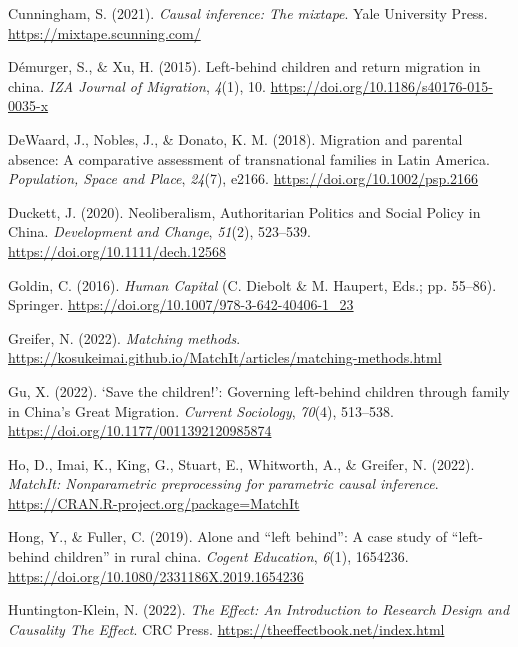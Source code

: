 \documentclass[
  man,floatsintext]{apa7}
\newlength{\cslhangindent}
\newlength{\cslentryspacingunit} %
\newenvironment{CSLReferences}[2] %
 {%
  \setlength{\parindent}{0pt}
  \ifodd #1
  \let\oldpar\par
  \def\par{\hangindent=\cslhangindent\oldpar}
  \fi
  \setlength{\parskip}{#2\cslentryspacingunit}
 }%
 {}
\begin{document}
\begin{CSLReferences}{1}{0}
\leavevmode{}%
Cunningham, S. (2021). \emph{Causal inference: The mixtape}. Yale University Press. \url{https://mixtape.scunning.com/}

\leavevmode{}%
Démurger, S., \& Xu, H. (2015). Left-behind children and return migration in china. \emph{IZA Journal of Migration}, \emph{4}(1), 10. \url{https://doi.org/10.1186/s40176-015-0035-x}

\leavevmode{}%
DeWaard, J., Nobles, J., \& Donato, K. M. (2018). Migration and parental absence: A comparative assessment of transnational families in Latin America. \emph{Population, Space and Place}, \emph{24}(7), e2166. \url{https://doi.org/10.1002/psp.2166}

\leavevmode{}%
Duckett, J. (2020). Neoliberalism, Authoritarian Politics and Social Policy in China. \emph{Development and Change}, \emph{51}(2), 523--539. \url{https://doi.org/10.1111/dech.12568}

\leavevmode{}%
Goldin, C. (2016). \emph{Human Capital} (C. Diebolt \& M. Haupert, Eds.; pp. 55--86). Springer. \url{https://doi.org/10.1007/978-3-642-40406-1_23}

\leavevmode{}%
Greifer, N. (2022). \emph{Matching methods}. \url{https://kosukeimai.github.io/MatchIt/articles/matching-methods.html}

\leavevmode{}%
Gu, X. (2022). {`}Save the children!{'}: Governing left-behind children through family in China{'}s Great Migration. \emph{Current Sociology}, \emph{70}(4), 513--538. \url{https://doi.org/10.1177/0011392120985874}

\leavevmode{}%
Ho, D., Imai, K., King, G., Stuart, E., Whitworth, A., \& Greifer, N. (2022). \emph{MatchIt: Nonparametric preprocessing for parametric causal inference}. \url{https://CRAN.R-project.org/package=MatchIt}

\leavevmode{}%
Hong, Y., \& Fuller, C. (2019). Alone and {``}left behind{''}: A case study of {``}left-behind children{''} in rural china. \emph{Cogent Education}, \emph{6}(1), 1654236. \url{https://doi.org/10.1080/2331186X.2019.1654236}

\leavevmode{}%
Huntington-Klein, N. (2022). \emph{The Effect: An Introduction to Research Design and Causality \textbar{} The Effect}. CRC Press. \url{https://theeffectbook.net/index.html}


\end{CSLReferences}
\end{document}

